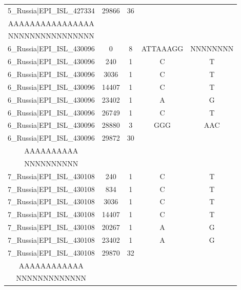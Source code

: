 \documentclass[a4paper,10pt]{article}
\begin{document}
\begin{longtable}{@{}ccccc@{}}
5\_Russia|EPI\_ISL\_427334 & 29866 & 36 & \begin{tabular}[c]{@{}c@{}}GACAAAAAAAAAAAAAAAAA\\ AAAAAAAAAAAAAAAA\end{tabular} & \begin{tabular}[c]{@{}c@{}}NNNNNNNNNNNNNNNNNNNN\\ NNNNNNNNNNNNNNNN\end{tabular} \\* \midrule
6\_Russia|EPI\_ISL\_430096 & 0 & 8 & ATTAAAGG & NNNNNNNN \\* \midrule
6\_Russia|EPI\_ISL\_430096 & 240 & 1 & C & T \\* \midrule
6\_Russia|EPI\_ISL\_430096 & 3036 & 1 & C & T \\* \midrule
6\_Russia|EPI\_ISL\_430096 & 14407 & 1 & C & T \\* \midrule
6\_Russia|EPI\_ISL\_430096 & 23402 & 1 & A & G \\* \midrule
6\_Russia|EPI\_ISL\_430096 & 26749 & 1 & C & T \\* \midrule
6\_Russia|EPI\_ISL\_430096 & 28880 & 3 & GGG & AAC \\* \midrule
6\_Russia|EPI\_ISL\_430096 & 29872 & 30 & \begin{tabular}[c]{@{}c@{}}AAAAAAAAAAAAAAAAAAAA\\ AAAAAAAAAA\end{tabular} & \begin{tabular}[c]{@{}c@{}}NNNNNNNNNNNNNNNNNNNN\\ NNNNNNNNNN\end{tabular} \\* \midrule
7\_Russia|EPI\_ISL\_430108 & 240 & 1 & C & T \\* \midrule
7\_Russia|EPI\_ISL\_430108 & 834 & 1 & C & T \\* \midrule
7\_Russia|EPI\_ISL\_430108 & 3036 & 1 & C & T \\* \midrule
7\_Russia|EPI\_ISL\_430108 & 14407 & 1 & C & T \\* \midrule
7\_Russia|EPI\_ISL\_430108 & 20267 & 1 & A & G \\* \midrule
7\_Russia|EPI\_ISL\_430108 & 23402 & 1 & A & G \\* \midrule
7\_Russia|EPI\_ISL\_430108 & 29870 & 32 & \begin{tabular}[c]{@{}c@{}}AAAAAAAAAAAAAAAAAAAA\\ AAAAAAAAAAAA\end{tabular} & \begin{tabular}[c]{@{}c@{}}NNNNNNNNNNNNNNNNNNN\\ NNNNNNNNNNNNN\end{tabular} \\* \bottomrule
\end{longtable}
\end{document}
